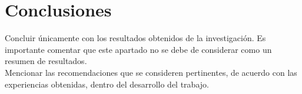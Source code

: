 \chapter{Conclusiones}

Concluir únicamente con los resultados obtenidos de la investigación. Es importante comentar que este apartado no se debe de considerar como un resumen de resultados.\\

Mencionar las recomendaciones que se consideren pertinentes, de acuerdo con las experiencias obtenidas, dentro del desarrollo del trabajo.


\lipsum[2-4]

\lipsum[2-4]

\lipsum[2-4]